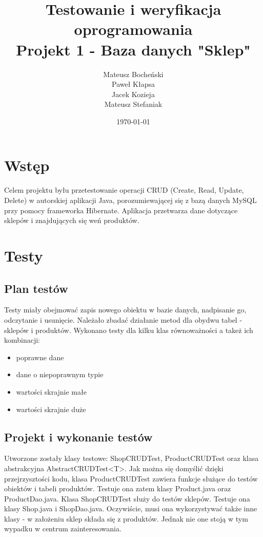 \documentclass[a4paper,11pt,notitlepage]{article}
\author{Mateusz Bocheński\\Paweł Kłapsa\\Jacek Kozieja\\Mateusz Stefaniak}
\title{Testowanie i weryfikacja oprogramowania \\ {\small Projekt 1 - Baza danych "Sklep"}}
\date{\today}
\begin{document}
\maketitle
\tableofcontents

\section{Wstęp}
Celem projektu byłu przetestowanie operacji CRUD (Create, Read, Update, Delete) w autorskiej aplikacji Java, porozumiewającej się z bazą danych MySQL przy pomocy frameworka Hibernate. Aplikacja przetwarza dane dotyczące sklepów i znajdujących się weń produktów.
\section{Testy}
\subsection{Plan testów}
Testy miały obejmować zapis nowego obiektu w bazie danych, nadpisanie go, odczytanie i usunięcie. Należało zbadać działanie metod dla obydwu tabel - sklepów i produktów. Wykonano testy dla kilku klas równoważności a takeż ich kombinacji:
\begin{itemize}
  \item poprawne dane
  \item dane o niepoprawnym typie
  \item wartości skrajnie małe
  \item wartości skrajnie duże
\end{itemize}

\subsection{Projekt i wykonanie testów}
Utworzone zostały klasy testowe: ShopCRUDTest, ProductCRUDTest oraz klasa abstrakcyjna AbstractCRUDTest<T>. Jak można się domyślić dzięki przejrzysztości kodu, klasa ProductCRUDTest zawiera funkcje służące do testów obiektów i tabeli produktów. Testuje ona zatem klasy Product.java oraz ProductDao.java. Klasa ShopCRUDTest służy do testów sklepów. Testuje ona klasy Shop.java i ShopDao.java. Oczywiście, musi ona wykorzystywać także inne klasy - w założeniu sklep składa się z produktów. Jednak nie one stoją w tym wypadku w centrum zainteresowania.
\end{document}
